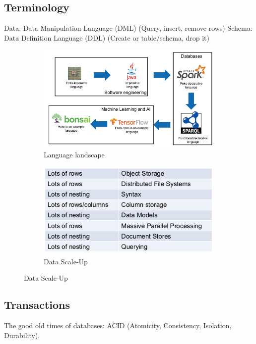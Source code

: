 \documentclass[11pt,oneside,a4paper]{article}
\begin{document}
\newpage

\subsection{Terminology}

Data: Data Manipulation Language (DML) (Query, insert, remove rows)
Schema: Data Definition Language (DDL) (Create or table/schema, drop it)
\vspace{-\topsep}
\begin{figure}[hb!]
	\centering
	\begin{subfigure}[t]{.5\textwidth}
		\centering
		\includegraphics[width=0.8\linewidth]{figures/language_landscape}
		\caption{Language landscape}
		\label{fig:languagelandscape}
	\end{subfigure}%
	\begin{subfigure}[t]{.5\textwidth}
		\centering
		\includegraphics[width=0.8\linewidth]{figures/scaling_up_overview}
		\caption{Data Scale-Up}
		\label{fig:scalingupoverview}
	\end{subfigure}
\end{figure}

\subsection{Transactions}

The good old times of databases: ACID (Atomicity, Consistency, Isolation, Durability).
\end{document}
